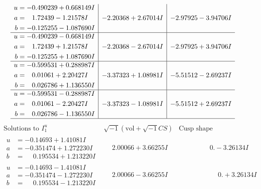 \documentclass[1p]{elsarticle_modified}
\theoremstyle{definition}
\newcommand{\I}{\sqrt{-1}}
\begin{document}
$$\begin{array}{c|c|c}
\begin{aligned}
u &= -0.490239 + 0.668149 I \\
a &= \phantom{-}1.72439 - 1.21578 I \\
b &= -0.125255 - 1.087690 I\end{aligned}
 & -2.20368 + 2.67014 I & -2.97925 - 3.94706 I \\ \hline\begin{aligned}
u &= -0.490239 - 0.668149 I \\
a &= \phantom{-}1.72439 + 1.21578 I \\
b &= -0.125255 + 1.087690 I\end{aligned}
 & -2.20368 - 2.67014 I & -2.97925 + 3.94706 I \\ \hline\begin{aligned}
u &= -0.599531 + 0.288987 I \\
a &= \phantom{-}0.01061 + 2.20427 I \\
b &= \phantom{-}0.026786 + 1.136550 I\end{aligned}
 & -3.37323 + 1.08981 I & -5.51512 - 2.69237 I \\ \hline\begin{aligned}
u &= -0.599531 - 0.288987 I \\
a &= \phantom{-}0.01061 - 2.20427 I \\
b &= \phantom{-}0.026786 - 1.136550 I\end{aligned}
 & -3.37323 - 1.08981 I & -5.51512 + 2.69237 I\\
 \hline 
 \end{array}$$\newpage$$\begin{array}{c|c|c}  
\text{Solutions to }I^u_{1}& \I (\text{vol} + \sqrt{-1}CS) & \text{Cusp shape}\\
 \hline 
\begin{aligned}
u &= -0.14693 + 1.41081 I \\
a &= -0.351474 + 1.272230 I \\
b &= \phantom{-}0.195534 + 1.213220 I\end{aligned}
 & \phantom{-}2.00066 + 3.66255 I & \phantom{-0.000000 } 0. - 3.26134 I \\ \hline\begin{aligned}
u &= -0.14693 - 1.41081 I \\
a &= -0.351474 - 1.272230 I \\
b &= \phantom{-}0.195534 - 1.213220 I\end{aligned}
 & \phantom{-}2.00066 - 3.66255 I & \phantom{-0.000000 -}0. + 3.26134 I \\ \hline\begin{aligned}

\end{aligned}
\end{array}$$
\end{document}
